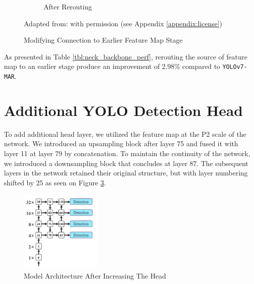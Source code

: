 \begin{figure}
\begin{subfigure}[][][t]{0.4\textwidth}
      \caption{After Rerouting}
      \label{fig:deeperconn-after}
    \end{subfigure}
    \caption*{Adapted from: \textcite{yolov7} with permission (see Appendix \ref{appendix:license})}
    \caption{Modifying Connection to Earlier Feature Map Stage}
    \label{fig:deeperconn}
\end{figure}

As presented in Table \ref{tbl:neck_backbone_perf}, rerouting the source of 
feature map to an earlier stage produce an improvement of 2.98\% compared to \verb*|YOLOv7-MAR|.

\begin{table}
  \centering
  \label{tbl:neck_backbone_perf}
  \vspace{-1ex}
  
\end{table}

\vspace{2ex}

\section{Additional YOLO Detection Head}
To add additional head layer, we utilized the feature map at the P2 scale of the network.
We introduced an upsampling block after layer 75 and fused it with layer 11 at layer 79 by concatenation.
To maintain the continuity of the network, we introduced a downsampling block that concludes at layer 87.
The subsequent layers in the network retained their original structure, but with layer numbering shifted by 25
as seen on Figure \ref{fig:addinghead}.
\begin{figure}
  \centering
  \includegraphics[width=0.35\textwidth]{figures/addheadn.png}
  \caption{Model Architecture After Increasing The Head}
  \label{fig:addinghead}
\end{figure}

